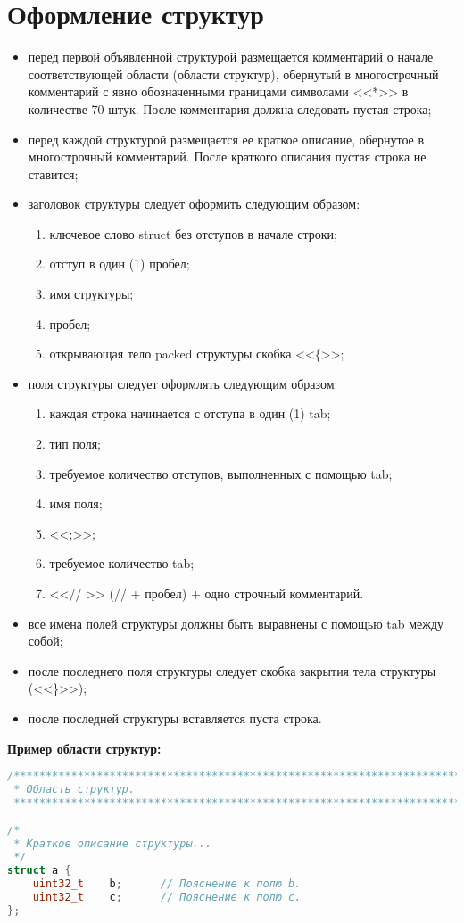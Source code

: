 \section{Оформление структур}
\begin{itemize}
	\item перед первой объявленной структурой размещается комментарий о начале соответствующей области (области структур), обернутый в многострочный комментарий с явно обозначенными границами символами <<*>> в количестве 70 штук. После комментария должна следовать  пустая строка;
	\item перед каждой структурой размещается ее краткое описание, обернутое в многострочный комментарий. После краткого описания пустая строка не ставится;
	\item заголовок структуры следует оформить следующим образом:
	\begin{enumerate}
		\item ключевое слово struct без отступов в начале строки;
		\item отступ в один (1) пробел;
		\item имя структуры;
		\item пробел;
		\item открывающая тело packed структуры скобка <<\{>>;
	\end{enumerate}
	\item поля структуры следует оформлять следующим образом:
	\begin{enumerate}
		\item каждая строка начинается с отступа в один (1) tab;
		\item тип поля;
		\item требуемое количество отступов, выполненных с помощью tab;
		\item имя поля;
		\item <<;>>;
		\item требуемое количество tab;
		\item <<// >> (// + пробел) + одно строчный комментарий.
	\end{enumerate}
	\item все имена полей структуры должны быть выравнены с помощью tab между собой;
	\item после последнего поля структуры следует скобка закрытия тела структуры (<<\}>>);
	\item после последней структуры вставляется пуста строка.
\end{itemize}\textbf{Пример области структур:}\begin{lstlisting}[language=C++, frame=tlBR, basicstyle=\fontsize{10}{10}\ttfamily]
/**********************************************************************
 * Область структур.
 **********************************************************************/

/*
 * Краткое описание структуры...
 */
struct a {
	uint32_t	b;		// Пояснение к полю b.
	uint32_t	c;		// Пояснение к полю c.
};\end{lstlisting}